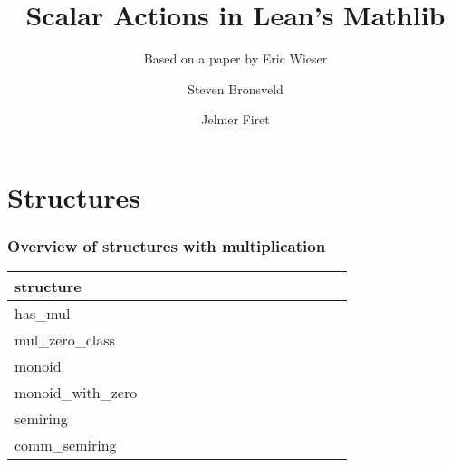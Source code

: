 \documentclass{beamer}
\author{Steven Bronsveld \and Jelmer Firet}
\title[Scalar Actions]{Scalar Actions in Lean's Mathlib}
\subtitle{Based on a paper by Eric Wieser\cite{wieserScalarActionsLean2021}}
\institute[Radboud University Nijmegen]{Radboud University Nijmegen}
\newcommand{\yes}{\checkmark}
\newcommand{\no}{}
\begin{document}
	\begin{frame}[t]
	\titlepage
	\end{frame}

	\section*{Structures} %
	\label{sec:structures}
	\begin{frame}
		\frametitle{Overview of structures with multiplication}
		\begin{tabular}{l*{14}{@{}c}}
			structure & 
				 &
				 &
				 &
				 &
				 &
				 &
				 &
				 &
				 &
				 &
				 &
				&
				\\
			\hline
			has\_mul			&\no	&\no	&\yes	&\no	&\no	&\no	&\no	&\no	&\no	&\no	&\no	&\no	&\no	\\
			mul\_zero\_class	&\yes	&\no	&\yes	&\yes	&\no	&\no	&\no	&\no	&\no	&\no	&\no	&\no	&\no	\\
			monoid				&\no	&\yes	&\yes	&\no	&\yes	&\yes	&\no	&\no	&\no	&\no	&\no	&\no	&\no	\\
			monoid\_with\_zero	&\yes	&\yes	&\yes	&\yes	&\yes	&\yes	&\no	&\no	&\no	&\no	&\no	&\no	&\no	\\
			semiring			&\yes	&\yes	&\yes	&\yes	&\yes	&\yes	&\no	&\yes	&\yes	&\yes	&\yes	&\yes	&\yes	\\
			comm\_semiring		&\yes	&\yes	&\yes	&\yes	&\yes	&\yes	&\yes	&\yes	&\yes	&\yes	&\yes	&\yes	&\yes	\\
		\end{tabular}
	\end{frame}
	
\end{document}
